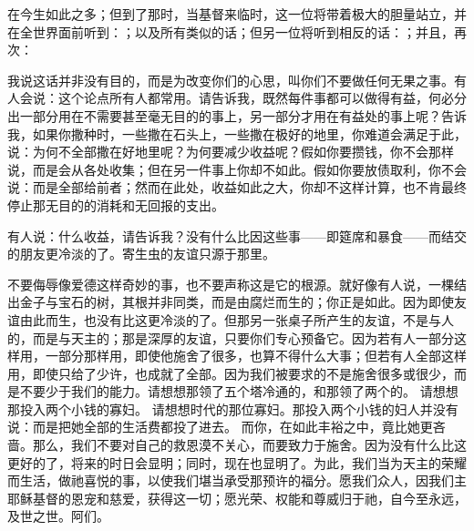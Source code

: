 在今生如此之多；但到了那时，当基督来临时，这一位将带着极大的胆量站立，并在全世界面前听到：；以及所有类似的话；但另一位将听到相反的话：；并且，再次：\par

我说这话并非没有目的，而是为改变你们的心思，叫你们不要做任何无果之事。有人会说：这个论点所有人都常用。请告诉我，既然每件事都可以做得有益，何必分出一部分用在不需要甚至毫无目的的事上，另一部分才用在有益处的事上呢？告诉我，如果你撒种时，一些撒在石头上，一些撒在极好的地里，你难道会满足于此，说：为何不全部撒在好地里呢？为何要减少收益呢？假如你要攒钱，你不会那样说，而是会从各处收集；但在另一件事上你却不如此。假如你要放债取利，你不会说：而是全部给前者；然而在此处，收益如此之大，你却不这样计算，也不肯最终停止那无目的的消耗和无回报的支出。\par

有人说：什么收益，请告诉我？没有什么比因这些事——即筵席和暴食——而结交的朋友更冷淡的了。寄生虫的友谊只源于那里。\par

不要侮辱像爱德这样奇妙的事，也不要声称这是它的根源。就好像有人说，一棵结出金子与宝石的树，其根并非同类，而是由腐烂而生的；你正是如此。因为即使友谊由此而生，也没有比这更冷淡的了。但那另一张桌子所产生的友谊，不是与人的，而是与天主的；那是深厚的友谊，只要你们专心预备它。因为若有人一部分这样用，一部分那样用，即使他施舍了很多，也算不得什么大事；但若有人全部这样用，即使只给了少许，也成就了全部。因为我们被要求的不是施舍很多或很少，而是不要少于我们的能力。请想想那领了五个塔冷通的，和那领了两个的。 请想想那投入两个小钱的寡妇。 请想想时代的那位寡妇。那投入两个小钱的妇人并没有说：而是把她全部的生活费都投了进去。 而你，在如此丰裕之中，竟比她更吝啬。那么，我们不要对自己的救恩漠不关心，而要致力于施舍。因为没有什么比这更好的了，将来的时日会显明；同时，现在也显明了。为此，我们当为天主的荣耀而生活，做祂喜悦的事，以使我们堪当承受那预许的福分。愿我们众人，因我们主耶稣基督的恩宠和慈爱，获得这一切；愿光荣、权能和尊威归于祂，自今至永远，及世之世。阿们。\par

